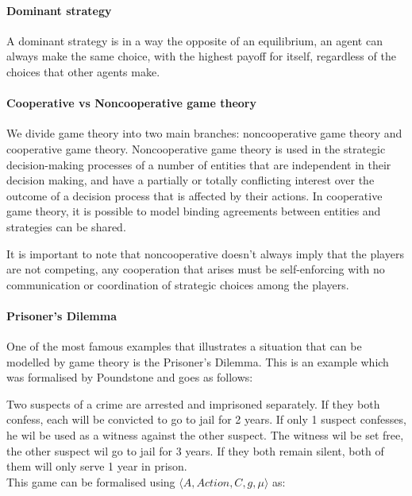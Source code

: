 \paragraph{Dominant strategy} 
A dominant strategy is in a way the opposite of an equilibrium, an agent can always make the same choice, with the highest payoff for itself, regardless of the choices that other agents make. 

\paragraph{Cooperative vs Noncooperative game theory} 
We divide game theory into two main branches: noncooperative game theory and cooperative game theory. Noncooperative game theory is used in the strategic decision-making processes of a number of entities that are independent in their decision making, and have a partially or totally conflicting interest over the outcome of a decision process that is affected by their actions\cite{keypaper}. In cooperative game theory, it is possible to model binding agreements between entities and strategies can be shared. 

It is important to note that noncooperative doesn't always imply that the players are not competing, any cooperation that arises must be self-enforcing with no communication or coordination of strategic choices among the players.\cite{keypaper}

\paragraph{Prisoner's Dilemma}
One of the most famous examples that illustrates a situation that can be modelled by game theory is the Prisoner's Dilemma. This is an example which was formalised by Poundstone \cite{poundstone} and goes as follows: 

Two suspects of a crime are arrested and imprisoned separately. If they both confess, each will be convicted to go to jail for 2 years. If only 1 suspect confesses, he wil be used as a witness against the other suspect. The witness wil be set free, the other suspect wil go to jail for 3 years. If they both remain silent, both of them will only serve 1 year in prison.\\
This game can be formalised using $\langle A,Action,C,g,\mu \rangle$ as:

